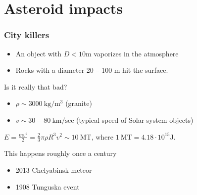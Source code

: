 \documentclass[aspectratio=169]{beamer}
\begin{document}
\section{Asteroid impacts}

\begin{frame}
\frametitle{City killers}
\begin{itemize}
\item An object with $D < 10 \mathrm{m}$ vaporizes in the atmosphere
\item Rocks with a diameter 20 -- 100 m hit the surface.
\end{itemize}

\begin{block}{Is it really that bad?}
\begin{itemize}
\item $\rho \sim 3000 \: \mathrm{kg/m^3}$ (granite)
\item $v \sim 30 - 80 \: \mathrm{km/sec}$ (typical speed of Solar system objects)
\end{itemize}
$E = \frac{m v^2}{2} = \frac{2}{3} \pi \rho R^3 v^2 \sim 10 \: \mathrm{MT}$,
where $1 \: \mathrm{MT} = 4.18 \cdot 10^{15} \mathrm{J}$.
\end{block}
\begin{block}{This happens roughly once a century}
\begin{itemize}
\item 2013 Chelyabinsk meteor 
\item 1908 Tunguska event
\end{itemize}
\end{block}
\end{frame}
\end{document}
